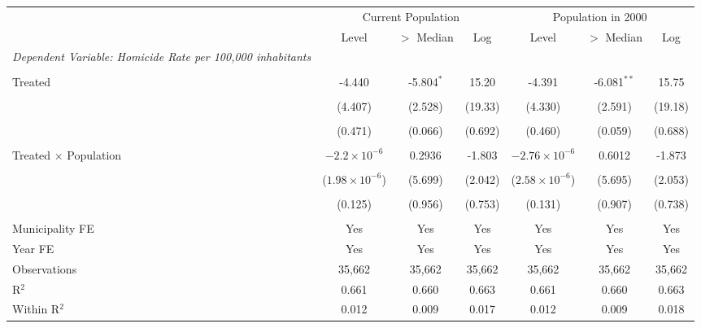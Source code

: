 \documentclass[12pt]{article}
\begin{document}
\begin{table}[htbp]
   \centering
   \begin{adjustbox}{width=\textwidth,center}
   \begin{tabular}{lcccccc}
      \tabularnewline \midrule \midrule
      & \multicolumn{3}{c}{Current Population} & \multicolumn{3}{c}{Population in 2000} \\
      \cmidrule(lr){2-4} \cmidrule(lr){5-7}
      & Level & $>$ Median & Log & Level & $>$ Median & Log \\
      \midrule
      \emph{Dependent Variable: Homicide Rate per 100,000 inhabitants} \\\\
      Treated & -4.440 & -5.804$^{*}$ & 15.20 & -4.391 & -6.081$^{**}$ & 15.75 \\\\
      & (4.407) & (2.528) & (19.33) & (4.330) & (2.591) & (19.18) \\\\
      & (0.471) & (0.066) & (0.692) & (0.460) & (0.059) & (0.688) \\\\
      Treated $\times$ Population & $-2.2\times 10^{-6}$ & 0.2936 & -1.803 & $-2.76\times 10^{-6}$ & 0.6012 & -1.873 \\\\
      & ($1.98\times 10^{-6}$) & (5.699) & (2.042) & ($2.58\times 10^{-6}$) & (5.695) & (2.053) \\\\
      & (0.125) & (0.956) & (0.753) & (0.131) & (0.907) & (0.738) \\\\
      \midrule
      Municipality FE & Yes & Yes & Yes & Yes & Yes & Yes \\
      Year FE & Yes & Yes & Yes & Yes & Yes & Yes \\
      Observations & 35,662 & 35,662 & 35,662 & 35,662 & 35,662 & 35,662 \\
      R$^2$ & 0.661 & 0.660 & 0.663 & 0.661 & 0.660 & 0.663 \\
      Within R$^2$ & 0.012 & 0.009 & 0.017 & 0.012 & 0.009 & 0.018 \\
      \midrule \midrule
   \end{tabular}
   \end{adjustbox}
\end{table}
\end{document}
